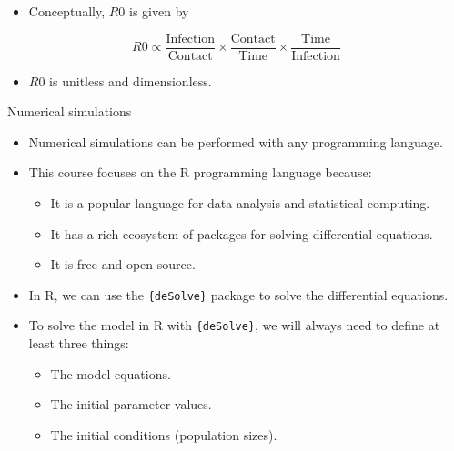 \documentclass[
  ignorenonframetext,
]{beamer}
\providecommand{\tightlist}{%
  \setlength{\itemsep}{0pt}\setlength{\parskip}{0pt}}\usepackage{longtable,booktabs,array}
\begin{document}
\begin{frame}
\begin{itemize}
\tightlist
\item
  Conceptually, \(R0\) is given by
\end{itemize}

\[
R0 \propto \dfrac{\text{Infection}}{\text{Contact}} \times \dfrac{\text{Contact}}{\text{Time}} \times \dfrac{\text{Time}}{\text{Infection}}
\]

\begin{itemize}
\tightlist
\item
  \(R0\) is unitless and dimensionless.
\end{itemize}
\end{frame}

\begin{frame}
\begin{block}{Numerical simulations}
\label{numerical-simulations}
\begin{itemize}
\item
  Numerical simulations can be performed with any programming language.
\item
  This course focuses on the R programming language because:

  \begin{itemize}
  \tightlist
  \item
    It is a popular language for data analysis and statistical
    computing.
  \item
    It has a rich ecosystem of packages for solving differential
    equations.
  \item
    It is free and open-source.
  \end{itemize}
\end{itemize}
\end{block}
\end{frame}

\begin{frame}[fragile]
\begin{itemize}
\item
  In R, we can use the \texttt{\{deSolve\}} package to solve the
  differential equations.
\item
  To solve the model in R with \texttt{\{deSolve\}}, we will always need
  to define at least three things:

  \begin{itemize}
  \tightlist
  \item
    The model equations.
  \item
    The initial parameter values.
  \item
    The initial conditions (population sizes).
  \end{itemize}
\end{itemize}
\end{frame}
\end{document}
